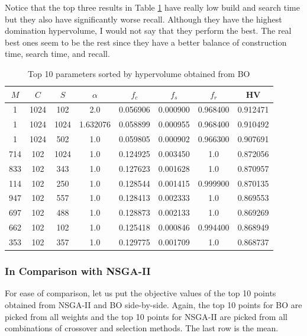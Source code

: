 Notice that the top three results in Table \ref{tbl:bo-top10} have really low build and search time but they also have significantly worse recall. Although they have the highest domination hypervolume, I would not say that they perform the best. The real best ones seem to be the rest since they have a better balance of construction time, search time, and recall.

\begin{table}[ht]
    \centering
    \caption{Top 10 parameters sorted by hypervolume obtained from BO}
    \label{tbl:bo-top10}
    \begin{tabular}{cccccccc}
        \toprule
        \(M\) & \(C\) & \(S\) & \(\alpha\) & \(f_c\) & \(f_s\) & \(f_r\) & HV \\
        \midrule
        1 & 1024 & 102 & 2.0 & 0.056906 & 0.000900 & 0.968400 & 0.912471 \\
        1 & 1024 & 1024 & 1.632076 & 0.058899 & 0.000955 & 0.968400 & 0.910492 \\
        1 & 1024 & 502 & 1.0 & 0.059805 & 0.000902 & 0.966300 & 0.907691 \\
        714 & 102 & 1024 & 1.0 & 0.124925 & 0.003450 & 1.0 & 0.872056 \\
        833 & 102 & 343 & 1.0 & 0.127623 & 0.001628 & 1.0 & 0.870957 \\
        114 & 102 & 250 & 1.0 & 0.128544 & 0.001415 & 0.999900 & 0.870135 \\
        947 & 102 & 557 & 1.0 & 0.128413 & 0.002333 & 1.0 & 0.869553 \\
        697 & 102 & 488 & 1.0 & 0.128873 & 0.002133 & 1.0 & 0.869269 \\
        662 & 102 & 102 & 1.0 & 0.125418 & 0.000846 & 0.994400 & 0.868949 \\
        353 & 102 & 357 & 1.0 & 0.129775 & 0.001709 & 1.0 & 0.868737 \\
        \bottomrule
    \end{tabular}
\end{table}

\subsubsection{In Comparison with NSGA-II}

For ease of comparison, let us put the objective values of the top 10 points obtained from NSGA-II and BO side-by-side. Again, the top 10 points for BO are picked from all weights and the top 10 points for NSGA-II are picked from all combinations of crossover and selection methods. The last row is the mean.


